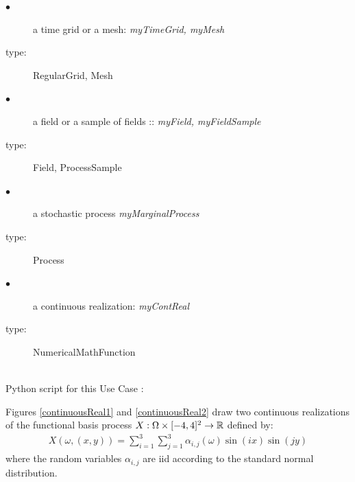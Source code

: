              {
               \begin{description}
               \item[$\bullet$] a time grid or a mesh: {\itshape myTimeGrid, myMesh}
               \item[type:]  RegularGrid, Mesh
               \end{description}

               \begin{description}
               \item[$\bullet$] a field or a  sample of fields :: {\itshape myField, myFieldSample}
               \item[type:]  Field, ProcessSample
               \end{description}

               \begin{description}
               \item[$\bullet$] a stochastic process {\itshape myMarginalProcess}
               \item[type:]  Process
               \end{description}

               \begin{description}
               \item[$\bullet$] a continuous realization: {\itshape myContReal}
               \item[type:] NumericalMathFunction
               \end{description}
             }

             \textspace\\
             Python script for this Use Case :

             Figures \ref{continuousReal1} and \ref{continuousReal2} draw two continuous realizations of the functional basis process  $X: \Omega \times [-4,4]^2 \rightarrow {\mathbb R}$ defined by:
             \begin{align}
               X(\omega,(x,y))=\sum_{i=1}^3 \sum_{j=1}^3 \alpha_{i,j}(\omega)\sin(ix) \sin(jy)
             \end{align}
             where the random variables $\alpha_{i,j}$ are iid according to the standard normal distribution.


